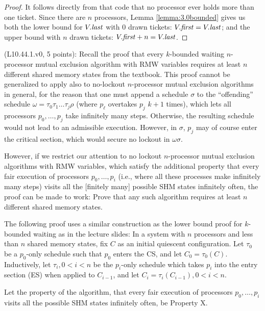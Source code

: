 \begin{proof}
It follows directly from that code that no processor ever holds more than one
ticket. Since there are $n$ processors, Lemma \ref{lemma:3.0bounded} gives us
both the lower bound for $V.\mathit{last}$ with $0$ drawn tickets: $V.\mathit{first} = V.\mathit{last}$;
and the upper bound with $n$ drawn tickets: $V.\mathit{first} + n = V.\mathit{last}$.
\end{proof}



\begin{Exc}{(L10.44.1.v0, 5 points):}
Recall the proof that every $k$-bounded waiting $n$-processor mutual exclusion
algorithm with RMW variables requires at least $n$ different shared
memory states from the textbook. This proof cannot be generalized to apply also to no-lockout
$n$-processor mutual exclusion algorithms in general, for the reason that one must
append a schedule $\sigma$ to the ``offending'' schedule $\omega=\tau_0\tau_1\dots\tau_j\rho$
(where $p_{\ell}$ overtakes $p_j$ $k+1$ times), which lets all processors
$p_0,\dots,p_j$ take infinitely many steps. Otherwise, the resulting schedule
would not lead to an admissible execution. However, in $\sigma$, $p_j$ may of course enter the
critical section, which would secure no lockout in $\omega\sigma$.

However, if we restrict our attention to no lockout $n$-processor
mutual exclusion algorithms with RMW variables, which satisfy the additional
property that every fair execution of processors $p_0,\dots,p_i$
(i.e., where all these processes make infinitely many steps)
visits all the [finitely many] possible SHM states infinitely often,
the proof can be
made to work: Prove that any such algorithm requires at least $n$
different shared memory states.
\end{Exc}

The following proof uses a similar construction as the lower bound proof for 
$k$-bounded waiting as in the lecture slides:
In a system with $n$ processors and less than $n$ 
shared memory states, fix $C$ as an initial quiescent configuration. Let
$\tau_0$ be a $p_0$-only schedule such that $p_0$ enters the CS,
and let $C_0 = \tau_0(C)$. Inductively, let $\tau_i, 0 < i < n$ be the $p_i$-only
schedule which takes $p_i$ into the entry section (ES) when applied to
$C_{i-1}$, and let $C_i = \tau_i(C_{i-1}), 0 < i < n$.

\begin{definition}
Let the property of the algorithm, that every fair execution of processors $p_0,\dots,p_i$
visits all the possible SHM states infinitely often, be Property X.
\end{definition}

